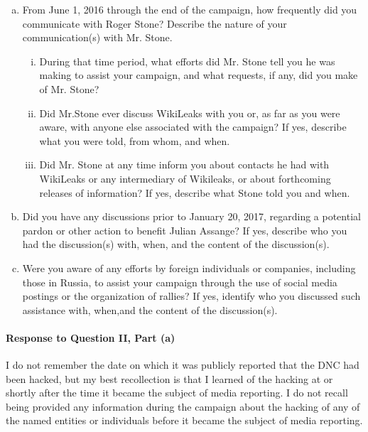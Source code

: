 \begin{enumerate}[a.]
\item From June 1, 2016 through the end of the campaign, how frequently did you communicate with Roger Stone? Describe the nature of your communication(s) with Mr. Stone.

\begin{enumerate}[i.]

\item During that time period, what efforts did Mr. Stone tell you he was making to assist your campaign, and what requests, if any, did you make of Mr. Stone?

\item Did Mr.Stone ever discuss WikiLeaks with you or, as far as you were aware, with anyone else associated with the campaign?
If yes, describe what you were told, from whom, and when.

\item Did Mr. Stone at any time inform you about contacts he had with WikiLeaks or any intermediary of Wikileaks, or about forthcoming releases of information?
If yes, describe what Stone told you and when.

\end{enumerate}

\item Did you have any discussions prior to January 20, 2017, regarding a potential pardon or other action to benefit Julian Assange?
If yes, describe who you had the discussion(s) with, when, and the content of the discussion(s).

\item Were you aware of any efforts by foreign individuals or companies, including those in Russia, to assist your campaign through the use of social media postings or the organization of rallies?
If yes, identify who you discussed such assistance with, when,and the content of the discussion(s).

\end{enumerate}

\paragraph*{Response to Question II, Part (a)}

I do not remember the date on which it was publicly reported that the DNC had been hacked, but my best recollection is that I learned of the hacking at or shortly after the time it became the subject of media reporting.
I do not recall being provided any information during the campaign about the hacking of any of the named entities or individuals before it became the subject of media reporting.

